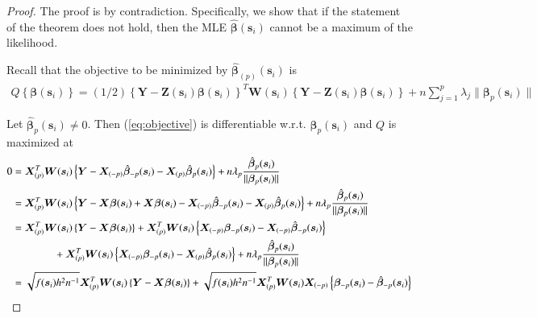\documentclass[authoryear, review, 11pt]{elsarticle}
\begin{document}
    \begin{proof}
      The proof is by contradiction. Specifically, we show that if the statement of the theorem does not hold, then the MLE $\hat{\bm{\beta}}(\bm{s}_i)$ cannot be a maximum of the likelihood.
      
      Recall that the objective to be minimized by $\hat{\bm{\beta}}_{(p)} (\bm{s}_i)$ is
      \begin{align}\label{eq:objective}
        Q \left\{ \bm{\beta}(\bm{s}_i) \right\} = (1/2) \left\{ \bm{Y} - \bm{Z}(\bm{s}_i) \bm{\beta}(\bm{s}_i) \right\}^T \bm{W}(\bm{s}_i) \left\{ \bm{Y} - \bm{Z}(\bm{s}_i) \bm{\beta}(\bm{s}_i) \right\} + n \sum_{j=1}^p \lambda_j \| \bm{\beta}_p(\bm{s}_i) \|
      \end{align}

      Let $\hat{\bm{\beta}}_p(\bm{s}_i) \ne 0$. Then (\ref{eq:objective}) is differentiable w.r.t. $\bm{\beta}_p(\bm{s}_i)$ and $Q$ is maximized at
      \begin{align}\label{eq:selection}
        0 &= \bm{X}_{(p)}^T \bm{W}(\bm{s}_i) \left\{ \bm{Y} - \bm{X}_{(-p)} \hat{\bm{\beta}}_{-p}(\bm{s}_i) - \bm{X}_{(p)} \hat{\bm{\beta}}_p(\bm{s}_i) \right\} + n \lambda_p \frac{ \hat{\bm{\beta}}_p(\bm{s}_i) }{\| \bm{\beta}_p(\bm{s}_i) \|} \notag \\
        &= \bm{X}_{(p)}^T \bm{W}(\bm{s}_i) \left\{ \bm{Y} - \bm{X} \bm{\beta}(\bm{s}_i) + \bm{X} \bm{\beta}(\bm{s}_i) -  \bm{X}_{(-p)} \hat{\bm{\beta}}_{-p}(\bm{s}_i) - \bm{X}_{(p)} \hat{\bm{\beta}}_p(\bm{s}_i) \right\} + n \lambda_p \frac{ \hat{\bm{\beta}}_p(\bm{s}_i) }{\| \bm{\beta}_p(\bm{s}_i) \|} \notag \\
        &= \bm{X}_{(p)}^T \bm{W}(\bm{s}_i) \left\{ \bm{Y} - \bm{X} \bm{\beta}(\bm{s}_i) \right\} + \bm{X}_{(p)}^T \bm{W}(\bm{s}_i) \left\{ \bm{X}_{(-p)} \bm{\beta}_{-p}(\bm{s}_i) - \bm{X}_{(-p)} \hat{\bm{\beta}}_{-p}(\bm{s}_i) \right\} \notag \\
        &\mkern+72mu+ \bm{X}_{(p)}^T \bm{W}(\bm{s}_i) \left\{ \bm{X}_{(-p)} \bm{\beta}_{-p}(\bm{s}_i) - \bm{X}_{(p)} \hat{\bm{\beta}}_p(\bm{s}_i) \right\} + n \lambda_p \frac{ \hat{\bm{\beta}}_p(\bm{s}_i) }{\| \bm{\beta}_p(\bm{s}_i) \|} \notag \\
        &= \sqrt{f(\bm{s}_i) h^2 n^{-1}} \bm{X}_{(p)}^T \bm{W}(\bm{s}_i) \left\{ \bm{Y} - \bm{X} \bm{\beta}(\bm{s}_i) \right\} + \sqrt{f(\bm{s}_i) h^2 n^{-1}} \bm{X}_{(p)}^T  \bm{W}(\bm{s}_i) \bm{X}_{(-p)} \left\{ \bm{\beta}_{-p}(\bm{s}_i) - \hat{\bm{\beta}}_{-p}(\bm{s}_i) \right\} \notag \\

\end{align}
\end{proof}
\end{document}
